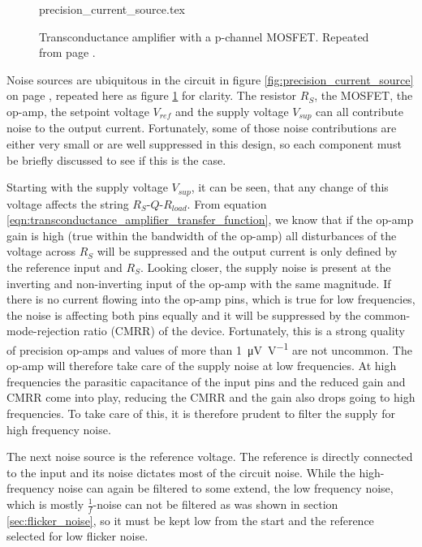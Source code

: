 \begin{figure}[ht]
    \centering
    {precision_current_source.tex}
    \caption{Transconductance amplifier with a p-channel MOSFET. Repeated from page \pageref{fig:precision_current_source}.}
    \label{fig:precision_current_source_noise}
\end{figure}

Noise sources are ubiquitous in the circuit in figure \ref{fig:precision_current_source} on page \pageref{fig:precision_current_source}, repeated here as figure \ref{fig:precision_current_source_noise} for clarity. The resistor $R_S$, the MOSFET, the op-amp, the setpoint voltage $V_{ref}$ and the supply voltage $V_{sup}$ can all contribute noise to the output current. Fortunately, some of those noise contributions are either very small or are well suppressed in this design, so each component must be briefly discussed to see if this is the case.

Starting with the supply voltage $V_{sup}$, it can be seen, that any change of this voltage affects the string $R_S$-$Q$-$R_{load}$. From equation \ref{eqn:transconductance_amplifier_transfer_function}, we know that if the op-amp gain is high (true within the bandwidth of the op-amp) all disturbances of the voltage across $R_S$ will be suppressed and the output current is only defined by the reference input and $R_S$. Looking closer, the supply noise is present at the inverting and non-inverting input of the op-amp with the same magnitude. If there is no current flowing into the op-amp pins, which is true for low frequencies, the noise is affecting both pins equally and it will be suppressed by the common-mode-rejection ratio (CMRR) of the device. Fortunately, this is a strong quality of precision op-amps and values of more than \qty[per-mode=power]{1}{\uV \per \volt} are not uncommon. The op-amp will therefore take care of the supply noise at low frequencies. At high frequencies the parasitic capacitance of the input pins and the reduced gain and CMRR come into play, reducing the CMRR and the gain also drops going to high frequencies. To take care of this, it is therefore prudent to filter the supply for high frequency noise.

The next noise source is the reference voltage. The reference is directly connected to the input and its noise dictates most of the circuit noise. While the high-frequency noise can again be filtered to some extend, the low frequency noise, which is mostly $\frac{1}{f}$-noise can not be filtered as was shown in section \ref{sec:flicker_noise}, so it must be kept low from the start and the reference selected for low flicker noise.

